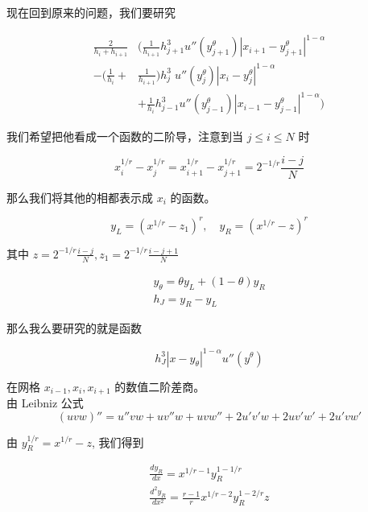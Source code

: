 \documentclass{ctexart}
\begin{document}
现在回到原来的问题，我们要研究

\begin{equation}
    \begin{aligned}
        \frac{2}{h_i + h_{i+1}} 
        & ( \frac{1}{h_{i+1}}  h_{j+1}^{3} u''(y_{j+1}^\theta) |x_{i+1} - y_{j+1}^\theta|^{1-\alpha} \\
        - (\frac{1}{h_{i}} +& \frac{1}{h_{i+1}}) h_j^{3} \; u''(y_j^\theta) |x_i - y_j^\theta|^{1-\alpha}    \\
        &+  \frac{1}{h_{i}} h_{j-1}^{3} u''(y_{j-1}^\theta) |x_{i-1} - y_{j-1}^\theta|^{1-\alpha} )
    \end{aligned}
\end{equation}

我们希望把他看成一个函数的二阶导，注意到当 \(j\le i\le N\) 时

\begin{equation}
    x_i^{1/r} - x_j^{1/r} = x_{i+1}^{1/r} - x_{j+1}^{1/r} = 2^{-1/r}\frac{i-j}{N}
\end{equation}

那么我们将其他的相都表示成 \(x_i\) 的函数。

\begin{equation}
        y_L = (x^{1/r} - z_1)^r , \quad y_R =  (x^{1/r} - z)^r
\end{equation}

其中 \(z = 2^{-1/r}\frac{i-j}{N}, z_1 = 2^{-1/r}\frac{i-j+1}{N}\)

\begin{gather}
    y_\theta = \theta y_L + (1-\theta) y_R      \\
    h_J = y_R - y_L
\end{gather}

那么我么要研究的就是函数

\begin{equation}
    h_J^3 |x - y_\theta|^{1-\alpha} u''(y^\theta)
\end{equation}

在网格 \(x_{i-1}, x_i , x_{i+1}\) 的数值二阶差商。\\

由 Leibniz 公式 
\begin{equation}
    (uvw)'' = u''vw + uv''w + uvw'' + 2u'v'w + 2uv'w' + 2u'vw'
\end{equation} 

由 \(y_R^{1/r} = x^{1/r} - z\), 我们得到

\begin{gather}
    \frac{d y_R}{dx} = x^{1/r-1} y_R^{1-1/r}    \\
    \frac{d^2 y_R}{dx^2} = \frac{r-1}{r} x^{1/r-2} y_R^{1-2/r}z    \\
\end{gather}
\end{document}
